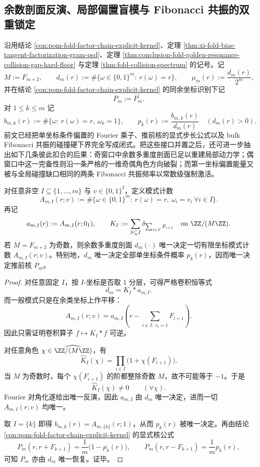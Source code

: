 \subsection{余数剖面反演、局部偏置盲模与 Fibonacci 共振的双重锁定}\label{subsec:conclusion-residue-local-bias-kernel-blindmode-resonance}
沿用结论 \ref{con:pom-fold-factor-chain-explicit-kernel}、定理 \ref{thm:xi-fold-bias-tangent-factorization-gram-psd}、定理 \ref{thm:conclusion-fold-golden-resonance-collision-gap-hard-floor} 与定理 \ref{thm:fold-collision-spectrum} 的记号。记
\[
M:=F_{m+2},
\qquad
d_m(r):=\#\{\omega\in\{0,1\}^m:\ r(\omega)=r\},
\qquad
\mu_m(r):=\frac{d_m(r)}{2^m},
\]
并在结论 \ref{con:pom-fold-factor-chain-explicit-kernel} 的同余坐标识别下记
\[
P_m:=\overline P_m^{\square}.
\]
对 \(1\le k\le m\) 记
\[
b_{m,k}(r):=\#\{\omega:\ r(\omega)=r,\ \omega_k=1\},
\qquad
p_k(r):=\frac{b_{m,k}(r)}{d_m(r)}
\quad (d_m(r)>0).
\]
前文已经把单坐标条件偏置的 Fourier 乘子、推前核的显式步长公式以及 bulk Fibonacci 共振的碰撞硬下界完全写成闭式。把这些接口并置之后，还可进一步抽出如下几条彼此扣合的后果：奇窗口中余数多重度剖面已足以重建局部动力学；偶窗口中这一完备性则沿一条严格的一维奇偶角色方向破裂；而第一坐标偏置能量又被与全局碰撞缺口相同的两条 Fibonacci 共振频率以常数级强制激活。

\begin{theorem}[奇窗口上的有限坐标约束完全反演]\label{thm:conclusion-residue-local-statistics-complete-reconstruction}
对任意非空 \(I\subseteq\{1,\dots,m\}\) 与 \(v\in\{0,1\}^{I}\)，定义模式计数
\[
A_{m,I}(r;v)
:=
\#\{\omega\in\{0,1\}^m:\ r(\omega)=r,\ \omega_i=v_i\ \forall i\in I\}.
\]
再记
\[
a_{m,I}(r):=A_{m,I}(r;0_I),
\qquad
K_I:=\sum_{S\subseteq I}\delta_{\sum_{i\in S}F_{i+1}}
\quad\text{on }\ZZ/(M\ZZ).
\]
若 \(M=F_{m+2}\) 为奇数，则余数多重度剖面 \(d_m(\cdot)\) 唯一决定一切有限坐标模式计数 \(A_{m,I}(r;v)\)。特别地，\(d_m\) 唯一决定全部单坐标条件概率 \(p_k(r)\)，因而唯一决定推前核 \(P_m\)。
\end{theorem}
\begin{proof}
对任意固定 \(I\)，按 \(I\)-坐标是否取 \(1\) 分层，可得严格卷积恒等式
\[
d_m=K_I*a_{m,I}.
\]
而一般模式只是在余类坐标上作平移：
\[
A_{m,I}(r;v)
=
a_{m,I}\!\left(r-\sum_{i\in I:\ v_i=1}F_{i+1}\right).
\]
因此只需证明卷积算子 \(f\mapsto K_I*f\) 可逆。

对任意角色 \(\chi\in \widehat{\ZZ/(M\ZZ)}\)，有
\[
\widehat K_I(\chi)=\prod_{i\in I}\bigl(1+\chi(F_{i+1})\bigr).
\]
当 \(M\) 为奇数时，每个 \(\chi(F_{i+1})\) 的阶都整除奇数 \(M\)，故不可能等于 \(-1\)。于是
\[
\widehat K_I(\chi)\neq 0
\qquad (\forall \chi).
\]
Fourier 对角化遂给出唯一反演，因此 \(a_{m,I}\) 由 \(d_m\) 唯一决定，进而一切 \(A_{m,I}(r;v)\) 均唯一。

取 \(I=\{k\}\) 即得 \(b_{m,k}(r)=A_{m,\{k\}}(r;1)\)，从而 \(p_k(r)\) 被唯一决定。再由结论 \ref{con:pom-fold-factor-chain-explicit-kernel} 的显式核公式
\[
P_m(r,r+F_{k+1})=\frac{1}{m}\bigl(1-p_k(r)\bigr),
\qquad
P_m(r,r-F_{k+1})=\frac{1}{m}p_k(r),
\]
可知 \(P_m\) 亦由 \(d_m\) 唯一恢复。证毕。
\end{proof}

